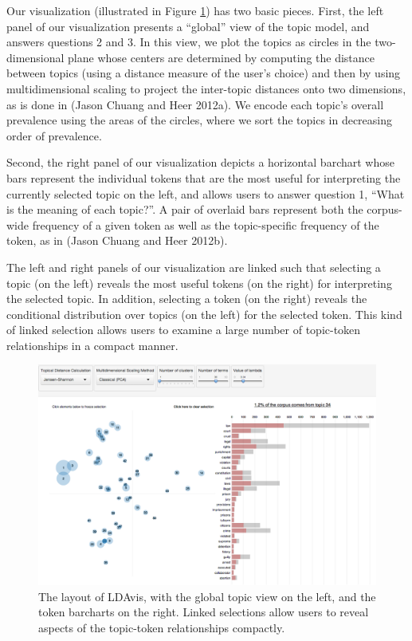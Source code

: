 \documentclass[12pt,]{isuthesis}
\begin{document}
Our visualization (illustrated in Figure \ref{fig:overview}) has two
basic pieces. First, the left panel of our visualization presents a
``global'' view of the topic model, and answers questions 2 and 3. In
this view, we plot the topics as circles in the two-dimensional plane
whose centers are determined by computing the distance between topics
(using a distance measure of the user's choice) and then by using
multidimensional scaling to project the inter-topic distances onto two
dimensions, as is done in (Jason Chuang and Heer 2012a). We encode each
topic's overall prevalence using the areas of the circles, where we sort
the topics in decreasing order of prevalence.

Second, the right panel of our visualization depicts a horizontal
barchart whose bars represent the individual tokens that are the most
useful for interpreting the currently selected topic on the left, and
allows users to answer question 1, ``What is the meaning of each
topic?''. A pair of overlaid bars represent both the corpus-wide
frequency of a given token as well as the topic-specific frequency of
the token, as in (Jason Chuang and Heer 2012b).

The left and right panels of our visualization are linked such that
selecting a topic (on the left) reveals the most useful tokens (on the
right) for interpreting the selected topic. In addition, selecting a
token (on the right) reveals the conditional distribution over topics
(on the left) for the selected token. This kind of linked selection
allows users to examine a large number of topic-token relationships in a
compact manner.

\begin{figure}
\includegraphics[width=17in]{images/fig_topic34} \caption{The layout of LDAvis, with the global topic view on the left, and the token barcharts on the right. Linked selections allow users to reveal aspects of the topic-token relationships compactly.}\label{fig:overview}
\end{figure}
\end{document}
